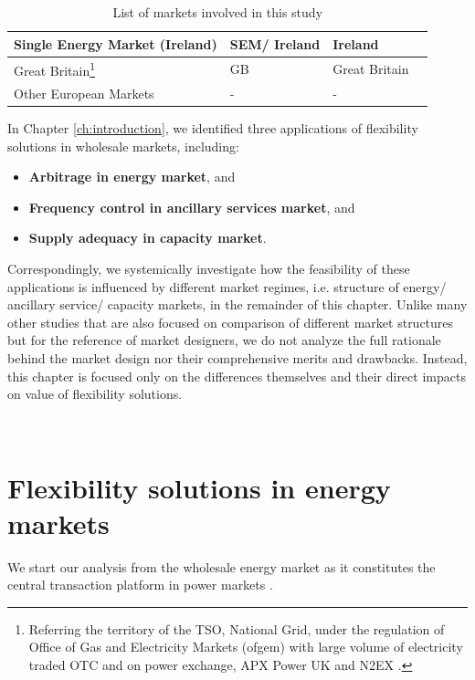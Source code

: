 \begin{table}[h!]
\begin{tabular}{L{5cm} l l l}
		\hline
		Single Energy Market (Ireland) & SEM/ Ireland & Ireland & \cite{FrontierEconomics2016,Cochran2013}\\
		\hline
		Great Britain\footnote{Referring the territory of the TSO, National Grid, under the regulation of Office of Gas and Electricity Markets (ofgem) with large volume of electricity traded OTC and on power exchange, APX Power UK and N2EX .} & GB & Great Britain & \cite{Rebours2009,FrontierEconomics2016,ofgem_cm,ofgem_m,EnergyUK2017} \\
		\hline
		Other European Markets & - & - & \cite{FrontierEconomics2016}\\
		\hline
		\hline
	\end{tabular}
	\caption{List of markets involved in this study} \label{tab:markets}
\end{table}

In Chapter \ref{ch:introduction}, we identified three applications of flexibility solutions in wholesale markets, including:

\begin{itemize}
	\item \textbf{Arbitrage in energy market}, and
	\item \textbf{Frequency control in ancillary services market}, and
	\item \textbf{Supply adequacy in capacity market}. 
\end{itemize}

Correspondingly, we systemically investigate how the feasibility of these applications is influenced by different market regimes, i.e. structure of energy/ ancillary service/ capacity markets, in the remainder of this chapter. Unlike many other studies that are also focused on comparison of different market structures but for the reference of market designers, we do not analyze the full rationale behind the market design nor their comprehensive merits and drawbacks. Instead, this chapter is focused only on the differences themselves and their direct impacts on value of flexibility solutions.


~\newpage

\section[Flexibility solutions in energy markets]{Flexibility solutions in energy markets%
	}
\label{sec:market-energy}
We start our analysis from the wholesale energy market as it constitutes the central transaction platform in power markets \cite{Cochran2013}. 

